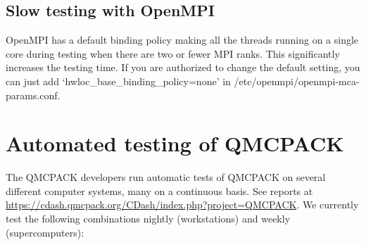 \subsection{Slow testing with OpenMPI}
OpenMPI has a default binding policy making all the threads running on a single core during testing when there are two or fewer MPI ranks.
This significantly increases the testing time. If you are authorized to change the default setting, you can just add `hwloc\_base\_binding\_policy=none' in /etc/openmpi/openmpi-mca-params.conf.

\section{Automated testing of QMCPACK}

The QMCPACK developers run automatic tests of QMCPACK on several
different computer systems,  many on a continuous basis. See reports at
\url{https://cdash.qmcpack.org/CDash/index.php?project=QMCPACK}.
We currently test
the following combinations nightly (workstations) and weekly (supercomputers):

